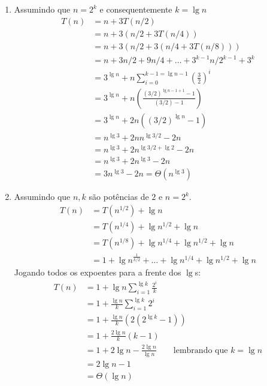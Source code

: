 \documentclass{article}
\begin{document}
\begin{enumerate}
\begin{enumerate}
		\item Assumindo que $n=2^k$ e consequentemente $k = \lg n$
		\begin{align*}
			T(n) &= n + 3T(n/2) \\
			&= n + 3(n/2 + 3T(n/4)) \\
			&= n + 3(n/2 + 3(n/4 + 3T(n/8))) \\
			&= n + 3n/2 + 9n/4 + \ldots + 3^{k-1}n/2^{k-1} + 3^k \\
			&= 3^{\lg n}+n\sum_{i=0}^{k-1=\lg n-1}\left(\frac{3}{2}\right)^i \\
			&= 3^{\lg n}+n\left(\frac{(3/2)^{\lg n -1+1}-1}{(3/2)-1}\right) \\
			&= 3^{\lg n} + 2n \left((3/2)^{\lg n}-1\right) \\
			&= n^{\lg 3} + 2nn^{\lg 3/2} - 2n \\
			&= n^{\lg 3} + 2n^{\lg 3/2 + \lg 2} - 2n \\
			&= n^{\lg 3} + 2n^{\lg 3} - 2n \\
			&= 3 n^{\lg 3} - 2n = \Theta(n^{\lg 3})
		\end{align*}

		\item Assumindo que $n, k$ são potências de $2$ e $n=2^k$.
		\begin{align*}
			T(n) &= T(n^{1/2}) + \lg n \\
			&= T(n^{1/4}) + \lg n^{1/2} + \lg n \\
			&= T(n^{1/8}) + \lg n^{1/4} + \lg n^{1/2} + \lg n \\
			&= 1 + \lg n^{\frac{1}{k/2}} + \ldots +
				\lg n^{1/4} + \lg n^{1/2} + \lg n
		\end{align*}
		Jogando todos os expoentes para a frente dos $\lg$s:
		\begin{align*}
			T(n) &= 1 + \lg n \sum_{i=1}^{\lg k}\frac{2^i}{k} \\
			&= 1 + \frac{\lg n}{k} \sum_{i=1}^{\lg k}2^i \\
			&= 1 + \frac{\lg n}{k} (2(2^{\lg k} - 1)) \\
			&= 1 + \frac{2 \lg n}{k} (k - 1) \\
			&= 1+2\lg n -\frac{2 \lg n}{\lg n}
				\qquad\text{lembrando que $k=\lg n$} \\
			&= 2\lg n - 1 \\
			&= \Theta(\lg n)
		\end{align*}

	\end{enumerate}

\end{enumerate}
\end{document}
